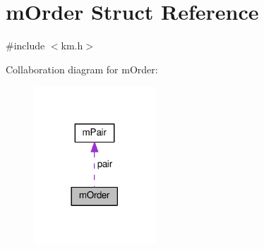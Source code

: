 \hypertarget{struct_k_1_1m_order}{}\section{m\+Order Struct Reference}
\label{struct_k_1_1m_order}


{\ttfamily \#include $<$km.\+h$>$}



Collaboration diagram for m\+Order\+:
\nopagebreak
\begin{figure}[H]
\begin{center}
\leavevmode
\includegraphics[width=129pt]{struct_k_1_1m_order__coll__graph}
\end{center}
\end{figure}
